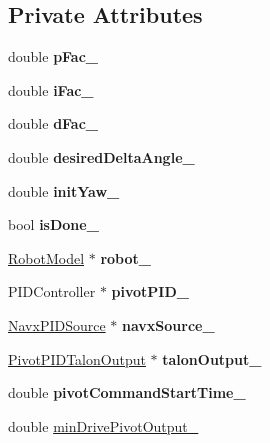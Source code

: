 \subsection*{Private Attributes}
\begin{DoxyCompactItemize}
\item 
\mbox{\label{class_pivot_command_af19ee15f8b4d195bf02fbc697eba1641}} 
double {\bfseries p\+Fac\+\_\+}
\item 
\mbox{\label{class_pivot_command_a8a4c07edea472ab21522cca70fe531a2}} 
double {\bfseries i\+Fac\+\_\+}
\item 
\mbox{\label{class_pivot_command_a076fe76ca613db3f914408607e91d7bc}} 
double {\bfseries d\+Fac\+\_\+}
\item 
\mbox{\label{class_pivot_command_aaf3bb529c25ee4d2ed040fdacb794d1f}} 
double {\bfseries desired\+Delta\+Angle\+\_\+}
\item 
\mbox{\label{class_pivot_command_aa0fc36f13532c492f5e86b4d5d0be93e}} 
double {\bfseries init\+Yaw\+\_\+}
\item 
\mbox{\label{class_pivot_command_a40b669643047869696913de119de0347}} 
bool {\bfseries is\+Done\+\_\+}
\item 
\mbox{\label{class_pivot_command_ad1fd030762a6b95d8c8ccad7375c2dcb}} 
\hyperlink{class_robot_model}{Robot\+Model} $\ast$ {\bfseries robot\+\_\+}
\item 
\mbox{\label{class_pivot_command_ae2fcdfa0e3be71c8b06a42440dbe3003}} 
P\+I\+D\+Controller $\ast$ {\bfseries pivot\+P\+I\+D\+\_\+}
\item 
\mbox{\label{class_pivot_command_a5fd31234c07b80cc3ffddb3ce28bc49b}} 
\hyperlink{class_navx_p_i_d_source}{Navx\+P\+I\+D\+Source} $\ast$ {\bfseries navx\+Source\+\_\+}
\item 
\mbox{\label{class_pivot_command_a590ea9a551076484febed96b6f7d9a64}} 
\hyperlink{class_pivot_p_i_d_talon_output}{Pivot\+P\+I\+D\+Talon\+Output} $\ast$ {\bfseries talon\+Output\+\_\+}
\item 
\mbox{\label{class_pivot_command_a5ec7f0d7b577e7830251e78a895798b5}} 
double {\bfseries pivot\+Command\+Start\+Time\+\_\+}
\item 
double \hyperlink{class_pivot_command_aa0b7e3b621788df09e8f2cc3c184b858}{min\+Drive\+Pivot\+Output\+\_\+}
\end{DoxyCompactItemize}
